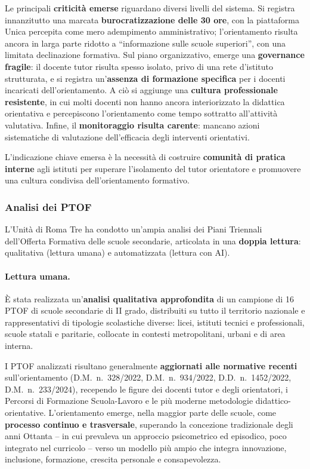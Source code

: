 \documentclass[12pt,a4paper]{article}
\begin{document}
Le principali \textbf{criticit\`a emerse} riguardano diversi livelli del sistema. Si registra innanzitutto una marcata \textbf{burocratizzazione delle 30 ore}, con la piattaforma Unica percepita come mero adempimento amministrativo; l'orientamento risulta ancora in larga parte ridotto a ``informazione sulle scuole superiori'', con una limitata declinazione formativa. Sul piano organizzativo, emerge una \textbf{governance fragile}: il docente tutor risulta spesso isolato, privo di una rete d'istituto strutturata, e si registra un'\textbf{assenza di formazione specifica} per i docenti incaricati dell'orientamento. A ci\`o si aggiunge una \textbf{cultura professionale resistente}, in cui molti docenti non hanno ancora interiorizzato la didattica orientativa e percepiscono l'orientamento come tempo sottratto all'attivit\`a valutativa. Infine, il \textbf{monitoraggio risulta carente}: mancano azioni sistematiche di valutazione dell'efficacia degli interventi orientativi.

L'indicazione chiave emersa \`e la necessit\`a di costruire \textbf{comunit\`a di pratica interne} agli istituti per superare l'isolamento del tutor orientatore e promuovere una cultura condivisa dell'orientamento formativo.

\subsubsection{Analisi dei PTOF}

L'Unit\`a di Roma Tre ha condotto un'ampia analisi dei Piani Triennali dell'Offerta Formativa delle scuole secondarie, articolata in una \textbf{doppia lettura}: qualitativa (lettura umana) e automatizzata (lettura con AI).

\paragraph{Lettura umana.}
\`E stata realizzata un'\textbf{analisi qualitativa approfondita} di un campione di 16 PTOF di scuole secondarie di II grado, distribuiti su tutto il territorio nazionale e rappresentativi di tipologie scolastiche diverse: licei, istituti tecnici e professionali, scuole statali e paritarie, collocate in contesti metropolitani, urbani e di area interna.

I PTOF analizzati risultano generalmente \textbf{aggiornati alle normative recenti} sull'orientamento (D.M.~n.~328/2022, D.M.~n.~934/2022, D.D.~n.~1452/2022, D.M.~n.~233/2024), recependo le figure dei docenti tutor e degli orientatori, i Percorsi di Formazione Scuola-Lavoro e le pi\`u moderne metodologie didattico-orientative. L'orientamento emerge, nella maggior parte delle scuole, come \textbf{processo continuo e trasversale}, superando la concezione tradizionale degli anni Ottanta -- in cui prevaleva un approccio psicometrico ed episodico, poco integrato nel curricolo -- verso un modello pi\`u ampio che integra innovazione, inclusione, formazione, crescita personale e consapevolezza.
\end{document}
